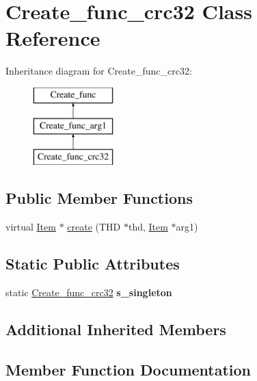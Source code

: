 \hypertarget{classCreate__func__crc32}{}\section{Create\+\_\+func\+\_\+crc32 Class Reference}
\label{classCreate__func__crc32}
Inheritance diagram for Create\+\_\+func\+\_\+crc32\+:\begin{figure}[H]
\begin{center}
\leavevmode
\includegraphics[height=3.000000cm]{classCreate__func__crc32}
\end{center}
\end{figure}
\subsection*{Public Member Functions}
\begin{DoxyCompactItemize}
\item 
virtual \mbox{\hyperlink{classItem}{Item}} $\ast$ \mbox{\hyperlink{classCreate__func__crc32_a05e0cac01d2085412bf3a9997316a53f}{create}} (T\+HD $\ast$thd, \mbox{\hyperlink{classItem}{Item}} $\ast$arg1)
\end{DoxyCompactItemize}
\subsection*{Static Public Attributes}
\begin{DoxyCompactItemize}
\item 
\mbox{\label{classCreate__func__crc32_ab15f76ac02a4d01f242a0729cdca9477}} 
static \mbox{\hyperlink{classCreate__func__crc32}{Create\+\_\+func\+\_\+crc32}} {\bfseries s\+\_\+singleton}
\end{DoxyCompactItemize}
\subsection*{Additional Inherited Members}


\subsection{Member Function Documentation}
\mbox{\label{classCreate__func__crc32_a05e0cac01d2085412bf3a9997316a53f}} 
